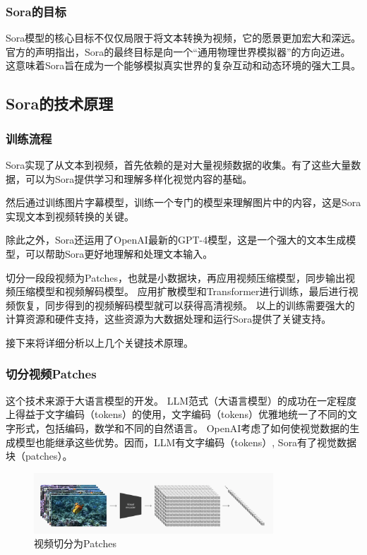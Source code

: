 \documentclass[12pt,a4paper,oneside]{article}
\begin{document}
\subsubsection{Sora的目标}
Sora模型的核心目标不仅仅局限于将文本转换为视频，它的愿景更加宏大和深远。
官方的声明指出，Sora的最终目标是向一个“通用物理世界模拟器”的方向迈进。
这意味着Sora旨在成为一个能够模拟真实世界的复杂互动和动态环境的强大工具。
\subsection{Sora的技术原理}
\subsubsection{训练流程}
Sora实现了从文本到视频，首先依赖的是对大量视频数据的收集。有了这些大量数据，可以为Sora提供学习和理解多样化视觉内容的基础。

然后通过训练图片字幕模型，训练一个专门的模型来理解图片中的内容，这是Sora实现文本到视频转换的关键。

除此之外，Sora还运用了OpenAI最新的GPT-4模型，这是一个强大的文本生成模型，可以帮助Sora更好地理解和处理文本输入。

切分一段段视频为Patches，也就是小数据块，再应用视频压缩模型，同步输出视频压缩模型和视频解码模型。
应用扩散模型和Transformer进行训练，最后进行视频恢复，同步得到的视频解码模型就可以获得高清视频。
以上的训练需要强大的计算资源和硬件支持，这些资源为大数据处理和运行Sora提供了关键支持。

接下来将详细分析以上几个关键技术原理。
\subsubsection{切分视频Patches}
这个技术来源于大语言模型的开发。
LLM范式（大语言模型）的成功在一定程度上得益于文字编码（tokens）的使用，文字编码（tokens）优雅地统一了不同的文字形式，包括编码，数学和不同的自然语言。
OpenAI考虑了如何使视觉数据的生成模型也能继承这些优势。因而，LLM有文字编码（tokens）, Sora有了视觉数据块（patches）。

\begin{figure}[htbp] 
    \centering 
    \includegraphics[width=0.8\textwidth]{2.png} 
    \caption{视频切分为Patches} 
    \label{Fig.main2} 
\end{figure}
\end{document}

